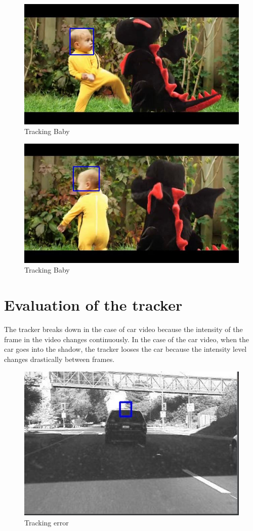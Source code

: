 \documentclass[12pt]{article}
\begin{document}
\begin{figure}[h]
    \centering
    \includegraphics[width=12cm]{trackbaby1}
    \caption{Tracking Baby}
    \label{fig:Tracking Baby}
\end{figure}
\newpage
\begin{figure}[h]
    \centering
    \includegraphics[width=12cm]{trackbaby2}
    \caption{Tracking Baby}
    \label{fig:Tracking Baby}
\end{figure}
\section{Evaluation of the tracker}
The tracker breaks down in the case of car video because the intensity of the frame in the video changes continuously. In the case of the car video, when the car goes into the shadow, the tracker looses the car because the intensity level changes drastically between frames. 
\begin{figure}[h]
    \centering
    \includegraphics[width=12cm]{trackcar3}
    \caption{Tracking error}
    \label{fig:Tracking error}
\end{figure}
\end{document}
